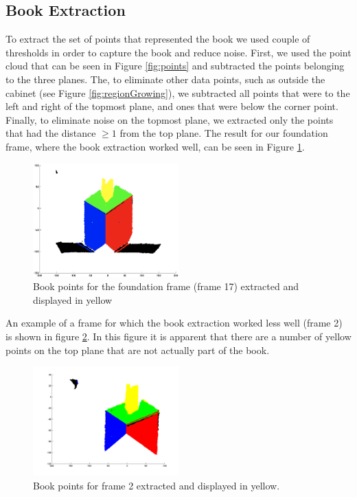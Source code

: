 \subsection{Book Extraction}
To extract the set of points that represented the book we used couple of thresholds in order to capture the book and reduce noise. First, we used the point cloud that can be seen in Figure \ref{fig:points} and subtracted the points belonging to the three planes. The, to eliminate other data points, such as outside the cabinet (see Figure \ref{fig:regionGrowing}), we subtracted all points that were to the left and right of the topmost plane, and ones that were below the corner point. Finally, to eliminate noise on the topmost plane, we extracted only the points that had the distance $\geq 1$ from the top plane. The result for our foundation frame, where the book extraction worked well, can be seen in Figure \ref{fig:bookPoints}.

\begin{figure}[H]
	\centering
	\includegraphics[width=0.5\textwidth]{Images/6-BookPoints(1).png}
	\caption{Book points for the foundation frame (frame 17) extracted and displayed in yellow}
	\label{fig:bookPoints}
\end{figure}

An example of a frame for which the book extraction worked less well (frame 2) is shown in figure \ref{fig:bookPointsFrame2}. In this figure it is apparent that there are a number of yellow points on the top plane that are not actually part of the book.

\begin{figure}[H]
	\centering
	\includegraphics[width=0.5\textwidth]{Images/6-BookPoints-frame2.png}
	\caption{Book points for frame 2 extracted and displayed in yellow.}
	\label{fig:bookPointsFrame2}
\end{figure}


